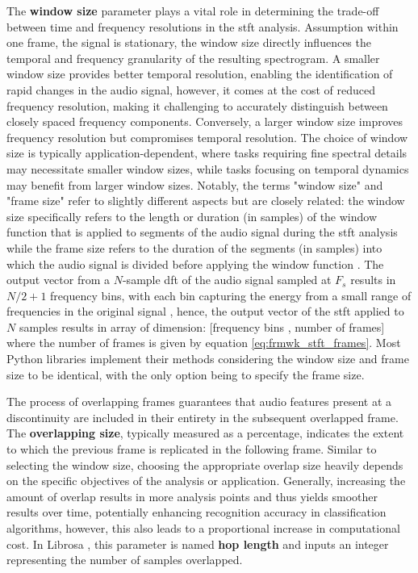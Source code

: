 The \textbf{window size} parameter plays a vital role in determining the trade-off between time and frequency resolutions in the \gls{stft} analysis. Assumption within one frame, the signal is stationary, the window size directly influences the temporal and frequency granularity of the resulting spectrogram. A smaller window size provides better temporal resolution, enabling the identification of rapid changes in the audio signal, however, it comes at the cost of reduced frequency resolution, making it challenging to accurately distinguish between closely spaced frequency components. Conversely, a larger window size improves frequency resolution but compromises temporal resolution. The choice of window size is typically application-dependent, where tasks requiring fine spectral details may necessitate smaller window sizes, while tasks focusing on temporal dynamics may benefit from larger window sizes. Notably, the terms "window size" and "frame size" refer to slightly different aspects but are closely related: the window size specifically refers to the length or duration (in samples) of the window function that is applied to segments of the audio signal during the \gls{stft} analysis while the frame size refers to the duration of the segments (in samples) into which the audio signal is divided before applying the window function \cite{Smith2013}. The output vector from a $N$-sample \gls{dft} of the audio signal sampled at $F_s$ results in $N/2 +1$ frequency bins, with each bin capturing the energy from a small range of frequencies in the original signal \cite{Abreha2014}, hence, the output vector of the \gls{stft} applied to $N$ samples results in array of dimension: [frequency bins , number of frames] where the number of frames is given by equation \ref{eq:frmwk_stft_frames}. Most Python libraries implement their methods considering the window size and frame size to be identical, with the only option being to specify the frame size.

The process of overlapping frames guarantees that audio features present at a discontinuity are included in their entirety in the subsequent overlapped frame. The \textbf{overlapping size}, typically measured as a percentage, indicates the extent to which the previous frame is replicated in the following frame. Similar to selecting the window size, choosing the appropriate overlap size heavily depends on the specific objectives of the analysis or application. Generally, increasing the amount of overlap results in more analysis points and thus yields smoother results over time, potentially enhancing recognition accuracy in classification algorithms, however, this also leads to a proportional increase in computational cost. In Librosa \cite{McFee2015librosa_sw}, this parameter is named \textbf{hop length} and inputs an integer representing the number of samples overlapped.


